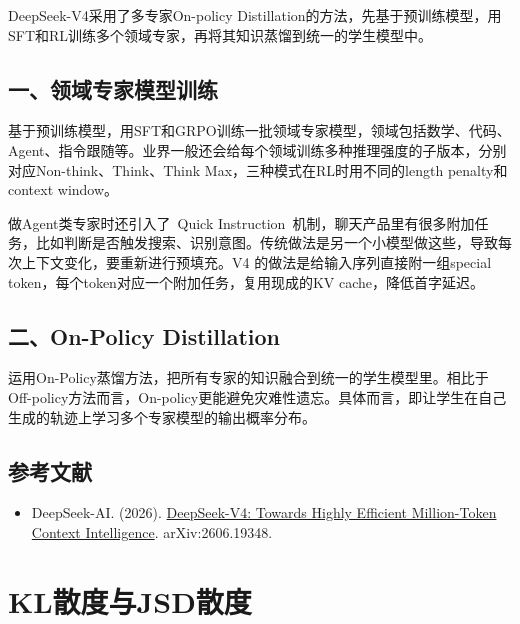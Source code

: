 DeepSeek-V4采用了多专家On-policy Distillation的方法，先基于预训练模型，用SFT和RL训练多个领域专家，再将其知识蒸馏到统一的学生模型中。

\hypertarget{ux4e00ux9886ux57dfux4e13ux5bb6ux6a21ux578bux8badux7ec3}{%
\subsection{一、领域专家模型训练}\label{ux4e00ux9886ux57dfux4e13ux5bb6ux6a21ux578bux8badux7ec3}}

基于预训练模型，用SFT和GRPO训练一批领域专家模型，领域包括数学、代码、Agent、指令跟随等。业界一般还会给每个领域训练多种推理强度的子版本，分别对应Non-think、Think、Think Max，三种模式在RL时用不同的length penalty和context window。

做Agent类专家时还引入了~Quick Instruction~机制，聊天产品里有很多附加任务，比如判断是否触发搜索、识别意图。传统做法是另一个小模型做这些，导致每次上下文变化，要重新进行预填充。V4 的做法是给输入序列直接附一组special token，每个token对应一个附加任务，复用现成的KV cache，降低首字延迟。

\hypertarget{ux4e8con-policy-distillation}{%
\subsection{二、On-Policy Distillation}\label{ux4e8con-policy-distillation}}

运用On-Policy蒸馏方法，把所有专家的知识融合到统一的学生模型里。相比于Off-policy方法而言，On-policy更能避免灾难性遗忘。具体而言，即让学生在自己生成的轨迹上学习多个专家模型的输出概率分布。

\hypertarget{ux53c2ux8003ux6587ux732e-106}{%
\subsection{参考文献}\label{ux53c2ux8003ux6587ux732e-106}}

\vspace{0.25em}
\begin{itemize}
\tightlist
\item
  DeepSeek-AI. (2026). \href{https://arxiv.org/abs/2606.19348}{DeepSeek-V4: Towards Highly Efficient Million-Token Context Intelligence}. arXiv:2606.19348.
\end{itemize}

\clearpage

\hypertarget{klux6563ux5ea6ux4e0ejsdux6563ux5ea6}{%
\section{KL散度与JSD散度}\label{klux6563ux5ea6ux4e0ejsdux6563ux5ea6}}

